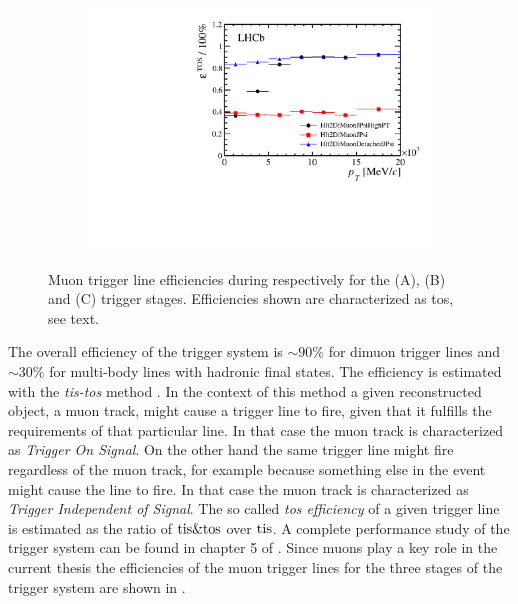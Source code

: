 \begin{figure}[t!]
\begin{subfigure}{0.5\textwidth}
    \includegraphics[width=\textwidth,trim=0.45cm 0cm 0.4cm 0cm, clip=true]{Figures/Chapter2/hlt2_muon_eff}
    \caption{}
    \label{det_run_one_hlt2_muon_line_eff}
  \end{subfigure}
  \caption{Muon trigger line efficiencies during \runone respectively for the \lzero (A), \hltone (B) and \hlttwo (C) trigger stages.
           Efficiencies shown are characterized as tos, see text.}
  \label{det_run_one_muon_line_eff}
\end{figure}

The overall efficiency of the \lhcb trigger system is $\sim 90\%$ for dimuon trigger lines and $\sim 30\%$
for multi-body lines with hadronic final states. The efficiency is estimated with the {\it tis-tos}
method \cite{LHCb-2008-073}. In the context of this method a given reconstructed object,
\ie a muon track, might cause a trigger line to fire, given that it fulfills the requirements of that particular line.
In that case the muon track is characterized as {\it Trigger On Signal}. On the other hand the same trigger line might
fire regardless of the muon track, for example because something else in the event might cause the line
to fire. In that case the muon track is characterized as {\it Trigger Independent of Signal}.
The so called {\it tos efficiency} of a given trigger line is estimated as the ratio of ${\rm tis}\&{\rm tos}$
over ${\rm tis}$. A complete performance study of the trigger system can be found in chapter 5
of \cite{Aaij:2014jba}. Since muons play a key role in the current thesis the efficiencies of the muon
trigger lines for the three stages of the \lhcb trigger system are  shown in .


